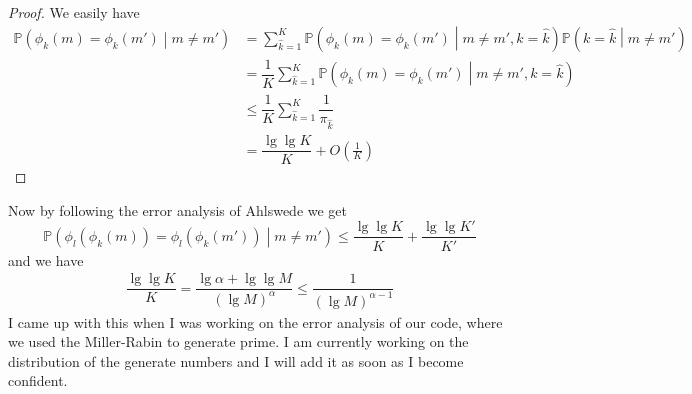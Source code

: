 \documentclass{article}
\begin{document}
\begin{proof}
	We easily have 
	\begin{align*}
		\mathbb{P}\left(  \phi_k(m) = \phi_k(m') \middle| m \neq  m'  \right) &= \sum_{\hat{k} = 1}^K \mathbb{P}\left(  \phi_k(m) = \phi_k(m') \middle| m \neq m', k = \hat{k}   \right) \mathbb{P}\left( k = \hat{k} \middle| m \neq m'  \right) \\
		&= \dfrac{1}{K} \sum_{\hat{k} = 1}^K \mathbb{P}\left(  \phi_k(m) = \phi_k(m')\middle| m \neq m', k = \hat{k}   \right) \\
		&\leq \dfrac{1}{K} \sum_{\hat{k} = 1}^K  \dfrac{1}{\pi_{\hat{k}}} \\
		&= \dfrac{\lg \lg K}{K} + O(\frac{1}{K})
	\end{align*}
\end{proof}
Now by following the error analysis of Ahlswede we get 
\begin{equation*}
	\mathbb{P}\left( \phi_l(\phi_k(m)) = \phi_l(\phi_k(m'))\middle| m \neq m'  \right) \leq \dfrac{\lg \lg K}{K} + \dfrac{\lg \lg K'}{K'}
\end{equation*}
and we have 
\begin{align*}
	\dfrac{\lg \lg K}{K} = \dfrac{\lg \alpha + \lg \lg M}{(\lg M)^{\alpha}} \leq \dfrac{1}{(\lg M)^{\alpha - 1}}
\end{align*}
I came up with this when I was working on the error analysis of our code, where we used the Miller-Rabin to generate prime. I am currently working on the distribution of the generate numbers and I will add it as soon as I become confident.

\end{document}
